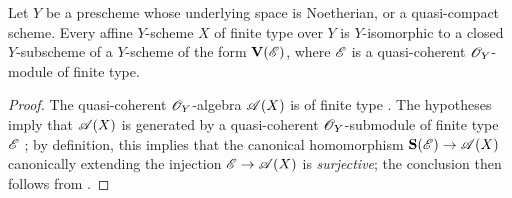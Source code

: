 \begin{proposition}[1.7.15]
\label{II.1.7.15}
Let $Y$ be a prescheme whose underlying space is Noetherian, or a quasi-compact scheme.
Every affine $Y$-scheme $X$ of finite type over $Y$ is $Y$-isomorphic to a closed $Y$-subscheme of a $Y$-scheme of the form $\mathbf{V}(\mathscr{E})$, where $\mathscr{E}$ is a quasi-coherent $\mathscr{O}_Y$-module of finite type.
\end{proposition}

\begin{proof}
The quasi-coherent $\mathscr{O}_Y$-algebra $\mathscr{A}(X)$ is of finite type .
The hypotheses imply that $\mathscr{A}(X)$ is generated by a quasi-coherent $\mathscr{O}_Y$-submodule of finite type $\mathscr{E}$ ; by definition, this implies that the canonical homomorphism $\bb{S}(\sh{E})\to\sh{A}(X)$ canonically extending the injection $\sh{E}\to\sh{A}(X)$ is \emph{surjective}; the conclusion then follows from .
\end{proof}

